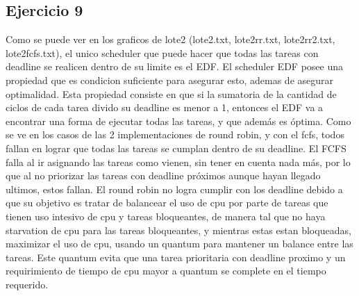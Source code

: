 \subsection{Ejercicio 9}
Como se puede ver en los graficos de lote2 (lote2.txt, lote2rr.txt, lote2rr2.txt, lote2fcfs.txt), el unico scheduler que puede hacer que todas las tareas con deadline se realicen dentro de su limite es el EDF.
El scheduler EDF posee una propiedad que es condicion suficiente para asegurar esto, ademas de asegurar optimalidad.
Esta propiedad consiste en que si la sumatoria de la cantidad de ciclos de cada tarea divido su deadline es menor a 1, entonces el EDF va a encontrar una forma de ejecutar todas las tareas, y que además es óptima. Como se ve en los casos de las 2 implementaciones de round robin, y con el fcfs, todos fallan en lograr que todas las tareas se cumplan dentro de su deadline.
El FCFS falla al ir asignando las tareas como vienen, sin tener en cuenta nada más, por lo que al no priorizar las tareas con deadline próximos aunque hayan llegado ultimos, estos fallan.
El round robin no logra cumplir con los deadline debido a que su objetivo es tratar de balancear el uso de cpu por parte de tareas que tienen uso intesivo de cpu y tareas bloqueantes, de manera tal que no haya starvation de cpu para las tareas bloqueantes, y mientras estas estan bloqueadas, maximizar el uso de cpu, usando un quantum para mantener un balance entre las tareas. Este quantum evita que una tarea prioritaria con deadline proximo y un requirimiento de tiempo de cpu mayor a quantum se complete en el tiempo requerido.